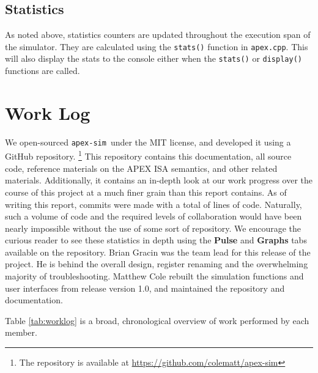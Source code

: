 \documentclass[12pt]{article}
\newcommand{\codename}[0]{\texttt{apex-sim}~}
\begin{document}
\subsection{Statistics}
As noted above, statistics counters are updated throughout the execution span of the simulator. They are calculated using the \texttt{stats()} function in \texttt{apex.cpp}. 
This will also display the stats to the console either when the \texttt{stats()} or \texttt{display()} functions are called. 


\section{Work Log}
\label{sec:worklog}
We open-sourced \codename under the MIT license, and developed it using a GitHub repository. \footnote{The repository is available at \url{https://github.com/colematt/apex-sim}}
This repository contains this documentation, all source code, reference materials on the APEX ISA semantics, and other related materials.
Additionally, it contains an in-depth look at our work progress over the course of this project at a much finer grain than this report contains.
As of writing this report,  commits were made with a total of  lines of code.
Naturally, such a volume of code and the required levels of collaboration would have been nearly impossible without the use of some sort of repository.
We encourage the curious reader to see these statistics in depth using the \textbf{Pulse} and \textbf{Graphs} tabs available on the repository.
Brian Gracin was the team lead for this release of the project. He is behind the overall design, register renaming and the overwhelming majority of troubleshooting.
Matthew Cole rebuilt the simulation functions and user interfaces from release version 1.0, and maintained the repository and documentation.


Table \ref{tab:worklog} is a broad, chronological overview of work performed by each member. 
\end{document}
